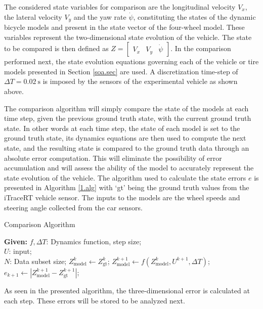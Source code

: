 \documentclass[journal]{IEEEtran}
\begin{document}
The considered state variables for comparison are the longitudinal velocity $V_x$, the lateral velocity $V_y$ and the yaw rate $\dot\psi$, constituting the states of the dynamic bicycle models and present in the state vector of the four-wheel model. These variables represent the two-dimensional state evolution of the vehicle. The state to be compared is then defined as $Z = \begin{bmatrix}
        V_x & V_y & \dot\psi
    \end{bmatrix}$. In the comparison performed next, the state evolution equations governing each of the vehicle or tire models presented in Section \ref{soa.sec} are used. A discretization time-step of $\Delta T = \SI{0.02}{\second}$ is imposed by the sensors of the experimental vehicle as shown above.

The comparison algorithm will simply compare the state of the models at each time step, given the previous ground truth state, with the current ground truth state. In other words at each time step, the state of each model is set to the ground truth state, its dynamics equations are then used to compute the next state, and the resulting state is compared to the ground truth data through an absolute error computation. This will eliminate the possibility of error accumulation and will assess the ability of the model to accurately represent the state evolution of the vehicle.  The algorithm used to calculate the state errors $e$ is presented in Algorithm \ref{1.alg} with `gt' being the ground truth values from the iTraceRT vehicle sensor. The inputs to the models are the wheel speeds and steering angle collected from the car sensors. 

\begin{algorithm}
\caption{Comparison Algorithm}\label{1.alg}
\begin{algorithmic}
\State \textbf{Given:}
$f, \Delta T$: Dynamics function, step size;\\
$U$: input;\\
$N$: Data subset size;
    \State $Z^k_{\text{model}} \gets Z^k_{\text{gt}}$;
    \State $Z^{k+1}_{\text{model}} \gets f(Z^{k}_{\text{model}}, U^{k+1}, \Delta T)$;
    \State $e_{k+1} \gets |Z^{k+1}_{\text{model}} - Z^{k+1}_{\text{gt}}|$;
\EndFor
\end{algorithmic}
\end{algorithm}

As seen in the presented algorithm, the three-dimensional error is calculated at each step. These errors will be stored to be analyzed next. 
\end{document}
